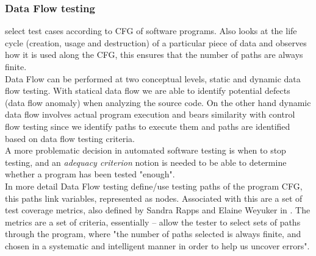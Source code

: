\documentclass[10pt, conference, compsocconf]{IEEEtran}
\begin{document}
\subsubsection{Data Flow testing} select test cases according to CFG of software programs. Also looks at the life cycle (creation, usage and destruction)
of a particular piece of data and observes how it is used along the CFG, this ensures that the number of paths are always finite\cite{dataflow}.\\
Data Flow can be performed at two conceptual levels, static and dynamic data flow testing. With statical data flow we are able to identify potential
defects (data flow anomaly) when analyzing the source code. On the other hand dynamic data flow involves actual program execution and bears similarity
with control flow testing since we identify paths to execute them and paths are identified based on data flow testing criteria.\\

A more problematic decision in automated software testing is when to stop testing, and an \textit{adequacy criterion}\cite{Frankl:1988:AFD:53064.53075} notion
is needed to be able to determine whether a program has been tested "enough".\\
In more detail Data Flow testing define/use testing paths of the program CFG, this paths link variables, represented as nodes\cite{dataflow}.
Associated with this are a set of test coverage metrics, also defined by Sandra Rapps and Elaine Weyuker in \cite{dataflow}.
The metrics are a set of criteria, essentially – allow the tester to select sets of paths through the program, where "the number of paths selected
is always finite, and chosen in a systematic and intelligent manner in order to help us uncover errors".
\end{document}

